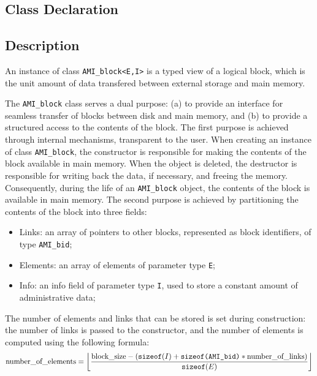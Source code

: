 \subsection{Class Declaration}
\btabb {}

   \etabb

\subsection{Description}

An instance of class \lstinline|AMI_block<E,I>| is a typed
view of a logical block, which is the unit amount of data transfered
between external storage and main memory. 

The \lstinline|AMI_block| class serves a dual purpose: (a) to provide an
interface for seamless transfer of blocks between disk and main memory,
and (b) to provide a structured access to the contents of the block.
The first purpose is achieved through internal mechanisms, transparent
to the user. When creating an instance of class \lstinline|AMI_block|, the
constructor is responsible for making the contents of the block
available in main memory. When the object is deleted, the destructor is
responsible for writing back the data, if necessary, and freeing the
memory. Consequently, during the life of an \lstinline|AMI_block| object, the
contents of the block is available in main memory.
The second purpose is achieved by partitioning the contents of the block
into three fields:
\begin{itemize}
\item[] Links: an array of pointers to other blocks, represented as
block identifiers, of type \lstinline|AMI_bid|;
\item[] Elements: an array of elements of parameter type \lstinline|E|;
\item[] Info: an info field of parameter type \lstinline|I|, used to store a 
constant amount of administrative data;
\end{itemize}

The number of elements and links that can be stored is set during
construction: the number of links is passed to the constructor, and the
number of elements is computed using the following formula:
\[\mbox{\rm number\_of\_elements} = \left\lfloor\frac{\mbox{\rm
block\_size} - (\mbox{\tt sizeof}(I) + \mbox{\tt sizeof(AMI\_bid)} *
\mbox{\rm number\_of\_links})}{\mbox{\tt sizeof}(E)}\right\rfloor \]

